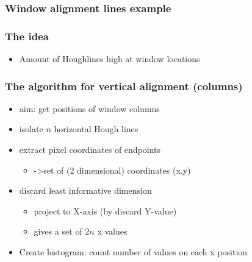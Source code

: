 \documentclass{beamer}
\begin{document}
\frame
{
	\frametitle{Window alignment lines example}
}

\frame
{
	\frametitle{The idea}
	\begin{itemize}
	\item <+-| alert@+> Amount of Houghlines high at window locations
	\end{itemize}
}

\frame
{
	\frametitle{The algorithm for vertical alignment (columns)}
	\begin{itemize}
	\item <+-| alert@+> aim: get positions of window columns
	\item <+-| alert@+> isolate $n$ horizontal Hough lines
	\item <+-| alert@+> extract pixel coordinates of endpoints 
		\begin{itemize}
		\item <+-| alert@+> ->set of (2 dimensional) coordinates (x,y)
		\end{itemize}
	\item <+-| alert@+> discard least informative dimension
		\begin{itemize}
		\item <+-| alert@+> project to X-axis (by discard Y-value) 
		\item <+-| alert@+> gives a set of $2n$ x values 
		\end{itemize}
	\item <+-| alert@+> Create histogram: count number of values on each x position
	\end{itemize}
}
\end{document}
